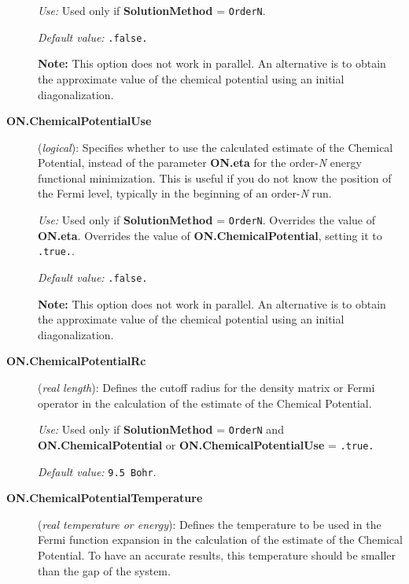 \begin{description}
\textit{Use:} Used only if \textbf{SolutionMethod} = \texttt{OrderN}.

\textit{Default value:} \texttt{.false.}

\textbf{Note:} This option does not work in parallel. An alternative
is to obtain the approximate value of the chemical potential using
an initial diagonalization.


\item[\textbf{ON.ChemicalPotentialUse}] (\textit{logical}):
Specifies whether to use the calculated estimate of the
Chemical Potential, instead of the parameter
\textbf{ON.eta}
for the order-\textit{N} energy functional minimization.
This is useful if you do not know the position
of the Fermi level, typically in the beginning
of an order-{\em N} run.

\textit{Use:} Used only if \textbf{SolutionMethod} = \texttt{OrderN}.
Overrides the value of \textbf{ON.eta}.
Overrides the value of \textbf{ON.ChemicalPotential}, setting
it to \texttt{.true.}.

\textit{Default value:} \texttt{.false.}

\textbf{Note:} This option does not work in parallel. An alternative
is to obtain the approximate value of the chemical potential using
an initial diagonalization.

\item[\textbf{ON.ChemicalPotentialRc}]  (\textit{real length}):
Defines the cutoff radius for the density matrix or Fermi
operator in the calculation of the estimate of the
Chemical Potential.

\textit{Use:} Used only if \textbf{SolutionMethod} = \texttt{OrderN}
and \textbf{ON.ChemicalPotential} or  \textbf{ON.ChemicalPotentialUse}
= \texttt{.true.}

\textit{Default value:} \texttt{9.5 Bohr}.

\item[\textbf{ON.ChemicalPotentialTemperature}]  (\textit{real temperature
or energy}):
Defines the temperature to be used in the Fermi function expansion
in the calculation of the estimate of the Chemical Potential.
To have an accurate results, this temperature should be smaller
than the gap of the system.


\end{description}
